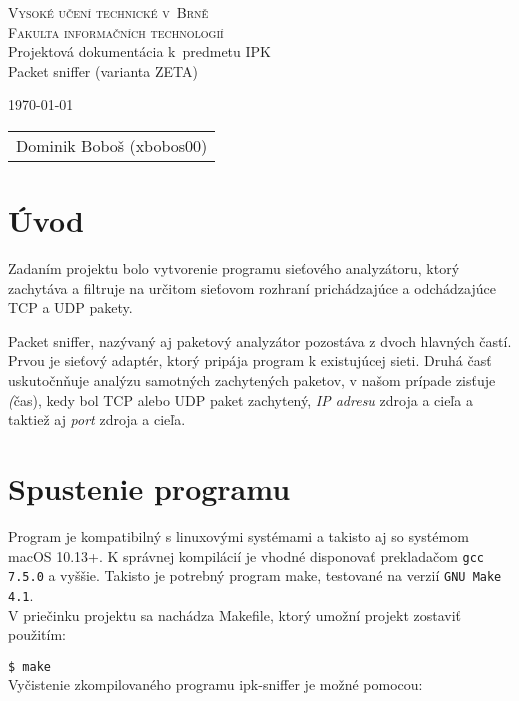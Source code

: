\documentclass[11pt, a4paper]{article}
\begin{document}
	\begin{titlepage}
		\begin{center}
			\Huge
			\textsc{Vysoké učení technické v~Brně} \\
			\huge
			\textsc{Fakulta informačních technologií} \\
			\LARGE
			Projektová dokumentácia k~predmetu IPK \\
			\Huge
			Packet sniffer (varianta ZETA)
		\end{center}

		{\Large
			\today
			\hfill
			\begin{tabular}{r}
			Dominik Boboš (xbobos00)
			\end{tabular}
		}
	\end{titlepage}
	
	\tableofcontents
	\newpage
	
	\section{Úvod}
	Zadaním projektu bolo vytvorenie programu sieťového analyzátoru, ktorý zachytáva a filtruje na určitom sieťovom rozhraní prichádzajúce a odchádzajúce TCP a UDP pakety.
	
	Packet sniffer, nazývaný aj paketový analyzátor pozostáva z dvoch hlavných častí. Prvou je sieťový adaptér, ktorý pripája program k existujúcej sieti. Druhá časť uskutočnňuje analýzu samotných zachytených paketov, v našom prípade zisťuje \emph(čas), kedy bol TCP alebo UDP paket zachytený, \emph{IP adresu} zdroja a cieľa a taktiež aj \emph{port} zdroja a cieľa\cite{Paessler}.
	
	\section{Spustenie programu}
	Program je kompatibilný s linuxovými systémami a takisto aj so systémom macOS 10.13+. K správnej kompilácií je vhodné disponovať prekladačom \texttt{gcc 7.5.0} a vyššie. Takisto je potrebný program make, testované na verzií \texttt{GNU Make 4.1}.\\
V priečinku projektu sa nachádza Makefile, ktorý umožní projekt zostaviť použitím:

\texttt{\$ make}\\
Vyčistenie zkompilovaného programu ipk-sniffer je možné pomocou:
\end{document}
